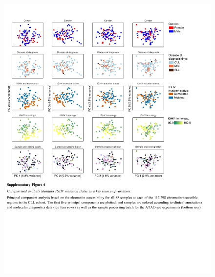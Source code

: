 \documentclass[10pt,]{article}
\begin{document}
\begin{figure}
\centering
\includegraphics[width=1.000\hsize]{figures/Supplementary_Information_06.pdf}
\end{figure}
\clearpage
\end{document}
